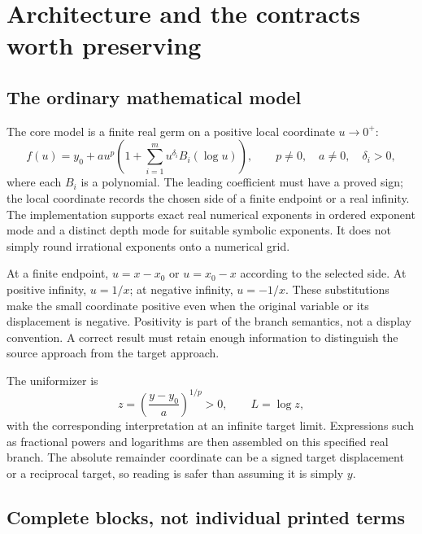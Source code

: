 \documentclass[11pt,a4paper]{article}
\newcommand{\code}[1]{\texttt{\detokenize{#1}}}
\theoremstyle{definition}
\begin{document}
\section{Architecture and the contracts worth preserving}
\label{sec:architecture}

\subsection{The ordinary mathematical model}

The core model is a finite real germ on a positive local coordinate $u\to0^+$:
\begin{equation}
 f(u)=y_0+a u^p\left(1+\sum_{i=1}^{m}u^{\delta_i}B_i(\log u)\right),
 \qquad p\ne0,\quad a\ne0,\quad\delta_i>0,
 \label{eq:model}
\end{equation}
where each $B_i$ is a polynomial. The leading coefficient must have a proved sign; the local coordinate records the chosen side of a finite endpoint or a real infinity. The implementation supports exact real numerical exponents in ordered exponent mode and a distinct depth mode for suitable symbolic exponents. It does not simply round irrational exponents onto a numerical grid.\cite{core,guide}

At a finite endpoint, $u=x-x_0$ or $u=x_0-x$ according to the selected side. At positive infinity, $u=1/x$; at negative infinity, $u=-1/x$. These substitutions make the small coordinate positive even when the original variable or its displacement is negative. Positivity is part of the branch semantics, not a display convention. A correct result must retain enough information to distinguish the source approach from the target approach.

The uniformizer is
\begin{equation}
 z=\left(\frac{y-y_0}{a}\right)^{1/p}>0,
 \qquad L=\log z,
 \label{eq:uniformizer}
\end{equation}
with the corresponding interpretation at an infinite target limit. Expressions such as fractional powers and logarithms are then assembled on this specified real branch. The absolute remainder coordinate can be a signed target displacement or a reciprocal target, so reading \code{s["RemainderVariable"]} is safer than assuming it is simply $y$.

\subsection{Complete blocks, not individual printed terms}
\end{document}
